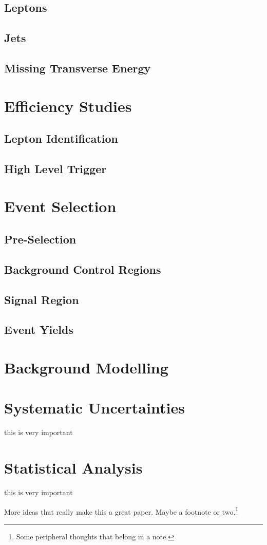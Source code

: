 \subsection{Leptons}
\subsection{Jets}
\subsection{Missing Transverse Energy}


\section{Efficiency Studies}
\subsection{Lepton Identification}
\subsection{High Level Trigger}

\section{Event Selection}
\subsection{Pre-Selection}
\subsection{Background Control Regions}
\subsection{Signal Region}
\subsection{Event Yields}

\section{Background Modelling}
\section{Systematic Uncertainties}
this is very important

\section{Statistical Analysis}
this is very important

More ideas that really make this a great paper. Maybe a footnote or two.\footnote{Some peripheral thoughts that belong in a note.}

